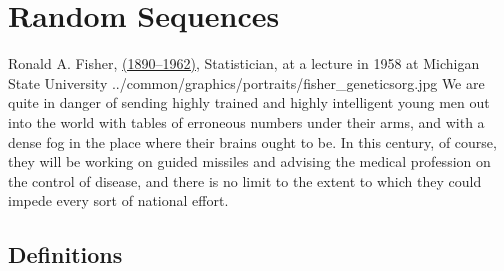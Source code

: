 \chapter{Random Sequences}
\label{app:random_processes}
\qboxnpq
  {
    Ronald A. Fisher,
    \href{http://www-history.mcs.st-andrews.ac.uk/Timelines/TimelineG.html}{(1890--1962)},
    Statistician,
    at a lecture in 1958 at Michigan State University
    \footnotemark
  }
  {../common/graphics/portraits/fisher_geneticsorg.jpg}
  {We are quite in danger of sending highly trained and highly intelligent
  young men out into the world with tables of erroneous numbers under their arms,
  and with a dense fog in the place where their brains ought to be.
  In this century, of course, they will be working on guided missiles and advising the
  medical profession on the control of disease,
  and there is no limit to the extent to which they could impede every sort of national effort.}

\section{Definitions}
\begin{definition}
\label{def:randseq}
\end{definition}

